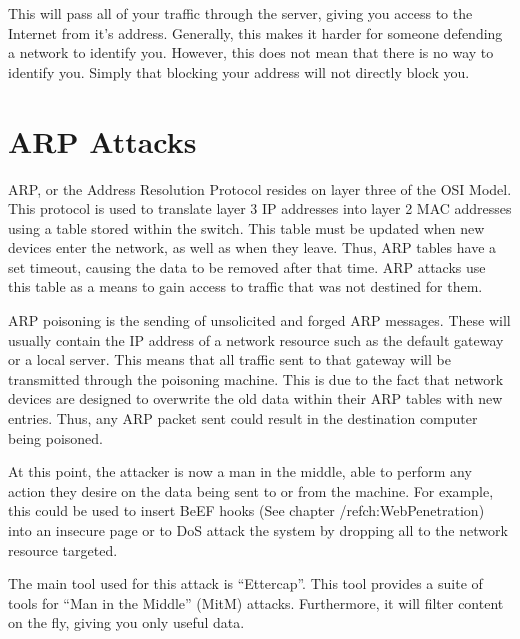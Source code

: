 		This will pass all of your traffic through the server, giving you access to the Internet from it's address. 
		Generally, this makes it harder for someone defending a network to identify you. 
		However, this does not mean that there is no way to identify you. 
		Simply that blocking your address will not directly block you. 

	\section{ARP Attacks}
		ARP, or the Address Resolution Protocol resides on layer three of the OSI Model. 
		This protocol is used to translate layer 3 IP addresses into layer 2 MAC addresses using a table stored within the switch. 
		This table must be updated when new devices enter the network, as well as when they leave. 
		Thus, ARP tables have a set timeout, causing the data to be removed after that time. 
		ARP attacks use this table as a means to gain access to traffic that was not destined for them. 

		ARP poisoning is the sending of unsolicited and forged ARP messages. 
		These will usually contain the IP address of a network resource such as the default gateway or a local server. 
		This means that all traffic sent to that gateway will be transmitted through the poisoning machine. 
		This is due to the fact that network devices are designed to overwrite the old data within their ARP tables with new entries. 
		Thus, any ARP packet sent could result in the destination computer being poisoned. 

		At this point, the attacker is now a man in the middle, able to perform any action they desire on the data being sent to or from the machine. 
		For example, this could be used to insert BeEF hooks (See chapter /ref{ch:WebPenetration}) into an insecure page or to DoS attack the system by dropping all to the network resource targeted. 

		The main tool used for this attack is ``Ettercap''. 
		This tool provides a suite of tools for ``Man in the Middle'' (MitM) attacks. 
		Furthermore, it will filter content on the fly, giving you only useful data. 

